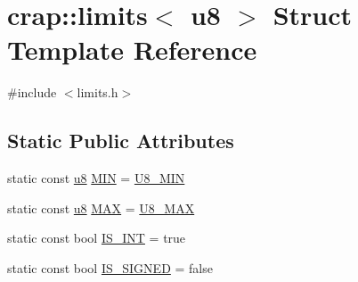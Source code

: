 \hypertarget{structcrap_1_1limits_3_01u8_01_4}{\section{crap\-:\-:limits$<$ u8 $>$ Struct Template Reference}
\label{structcrap_1_1limits_3_01u8_01_4}
}


{\ttfamily \#include $<$limits.\-h$>$}

\subsection*{Static Public Attributes}
\begin{DoxyCompactItemize}
\item 
static const \hyperlink{types_8h_a92c50087ca0e64fa93fc59402c55f8ca}{u8} \hyperlink{structcrap_1_1limits_3_01u8_01_4_a4a124feb65fbc522810c3e9c2fbb29ae}{M\-I\-N} = \hyperlink{types_8h_a50185cccc95df2269f9f4e400d1fa6ed}{U8\-\_\-\-M\-I\-N}
\item 
static const \hyperlink{types_8h_a92c50087ca0e64fa93fc59402c55f8ca}{u8} \hyperlink{structcrap_1_1limits_3_01u8_01_4_a0a25361a83b792daacb9fb54c2c1f2a2}{M\-A\-X} = \hyperlink{types_8h_a1187e707402ca2fca73f06f7beb1e631}{U8\-\_\-\-M\-A\-X}
\item 
static const bool \hyperlink{structcrap_1_1limits_3_01u8_01_4_a052fb6c41ae0f2fa6224b8bae28b9a89}{I\-S\-\_\-\-I\-N\-T} = true
\item 
static const bool \hyperlink{structcrap_1_1limits_3_01u8_01_4_a13b8efd8c3d5fb1b35f62f656a52cb38}{I\-S\-\_\-\-S\-I\-G\-N\-E\-D} = false
\end{DoxyCompactItemize}


